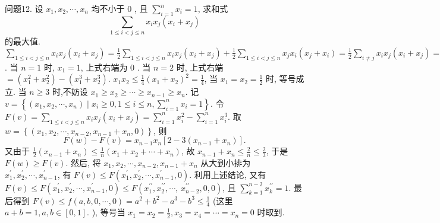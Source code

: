 问题12. 设 $x_1, x_2, \cdots, x_n$ 均不小于 0 , 且 $\sum_{i=1}^n x_i=1$, 求和式
$$
\sum_{1 \leqslant i<j \leqslant n} x_i x_j\left(x_i+x_j\right)
$$
的最大值.
$\sum_{1 \leqslant i<j \leqslant n} x_i x_j\left(x_i+x_j\right)=\frac{1}{2} \sum_{1 \leqslant i<j \leqslant n} x_i x_j\left(x_i+x_j\right)+\frac{1}{2} \sum_{1 \leqslant i<j \leqslant n} x_j x_i\left(x_j+\right.\left.x_i\right)=\frac{1}{2} \sum_{i \neq j} x_i x_j\left(x_i+x_j\right)=\frac{1}{2} \sum_{i \neq j} x_i^2 x_j+\frac{1}{2} \sum_{i \neq j} x_i x_j^2=\frac{1}{2} \sum_{i=1}^n x_i^2\left(1-x_i\right)+ \frac{1}{2} \sum_{j=1}^n x_j^2\left(1-x_j\right)=\sum_{i=1}^n x_i^2-\sum_{i=1}^n x_j^3$.
当 $n=1$ 时, $x_1=1$, 上式右端为 0 .
当 $n=2$ 时, 上式右端 $=\left(x_1^2+x_2^2\right)-\left(x_1^3+x_2^3\right)$.
$x_1 x_2 \leqslant \frac{1}{4}\left(x_1+x_2\right)^2=\frac{1}{4}$, 当 $x_1=x_2=\frac{1}{2}$ 时, 等号成立.
当 $n \geqslant 3$ 时,不妨设 $x_1 \geqslant x_2 \geqslant \cdots \geqslant x_{n-1} \geqslant x_n$.
记 $v=\left\{\left(x_1, x_2, \cdots, x_n\right) \mid x_i \geqslant 0,1 \leqslant i \leqslant n, \sum_{i=1}^n x_i=1\right\}$.
令 $F(v)=\sum_{1 \leqslant i<j \leqslant n} x_i x_j\left(x_i+x_j\right)=\sum_{i=1}^n x_i^2-\sum_{i=1}^n x_i^3$.
取 $w=\left\{\left(x_1, x_2, \cdots, x_{n-2}, x_{n-1}+x_n, 0\right)\right\}$, 则
$$
F(w)-F(v)=x_{n-1} x_n\left[2-3\left(x_{n-1}+x_n\right)\right] .
$$
又由于 $\frac{1}{2}\left(x_{n-1}+x_n\right) \leqslant \frac{1}{n}\left(x_1+x_2+\cdots+x_n\right)$, 故 $x_{n-1}+x_n \leqslant \frac{2}{n} \leqslant \frac{2}{3}$, 于是 $F(w) \geqslant F(v)$.
然后, 将 $x_1, x_2, \cdots, x_{n-2}, x_{n-1}+x_n$ 从大到小排为 $x_1^{\prime}, x_2^{\prime}, \cdots, x_{n-1}^{\prime}$, 有 $F(v) \leqslant F\left(x_1^{\prime}, x_2^{\prime}, \cdots, x_{n-1}^{\prime}, 0\right)$.
利用上述结论, 又有 $F(v) \leqslant F\left(x_1^{\prime}, x_2^{\prime}, \cdots, x_{n-1}^{\prime}, 0\right) \leqslant F\left(x_1^{\prime \prime}, x_2^{\prime \prime}, \cdots\right.$, $\left.x_{n-2}^{\prime \prime}, 0,0\right)$, 且 $\sum_{k=1}^{n-2} x_k^{\prime \prime}=1$.
最后得到 $F(v) \leqslant f(a, b, 0, \cdots, 0)=a^2+b^2-a^3-b^3 \leqslant \frac{1}{4}$ (这里 $a+ b=1, a, b \in[0,1]$. ), 等号当 $x_1=x_2=\frac{1}{2}, x_3=x_4=\cdots=x_n=0$ 时取到.



